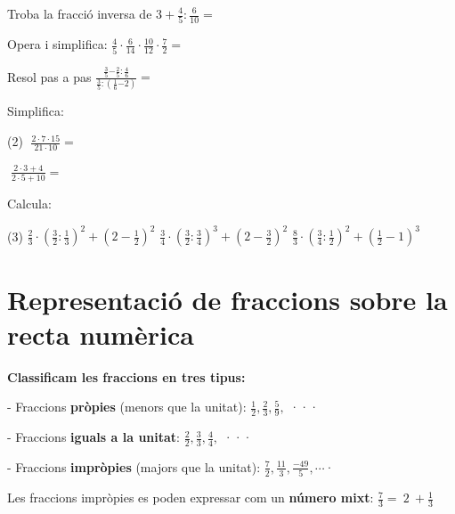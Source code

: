 \begin{mylist}
	\exer \spen Troba la fracció inversa de $\mathrm{3+}\frac{\mathrm{4}}{\mathrm{5}}\mathrm{:}\frac{\mathrm{6}}{\mathrm{10}}=$
	
	\exer  \spen Opera i simplifica: $\frac{4}{5} \cdot \frac{6}{14} \cdot \frac{10}{12} \cdot \frac{7}{2}=$
	
	\exer  Resol pas a pas  $\frac{\frac{\mathrm{3}}{\mathrm{5}}\mathrm{-}\frac{\mathrm{2}}{\mathrm{5}}\mathrm{:}\frac{\mathrm{4}}{\mathrm{6}}}{\frac{\mathrm{3}}{\mathrm{5}}\mathrm{:}\left( \frac{\mathrm{1}}{\mathrm{6}}\mathrm{-}\mathrm{2}\right)}=$ 
	
	\exer \spen Simplifica:  
	\begin{tasks}(2)
	\task $\; \frac{2\cdot 7\cdot 15}{21\cdot 10} = \quad \quad \quad$
	
	
	\task $\; \frac{2\cdot 3+4}{2\cdot 5+10}= $
	\end{tasks}
	\answers[cols=2]{[$1$, $\frac{1}{2}$]}

	\exer[1]  Calcula: 
 \begin{tasks}(3)
 	\task $\frac{2}{3} \cdot \left(\frac{3}{2} :\frac{1}{3} \right)^{2} +\left(2-\frac{1}{2} \right)^{2} $ 
 	\task $\frac{3}{4} \cdot \left(\frac{3}{2} :\frac{3}{4} \right)^{3} +\left(2-\frac{3}{2} \right)^{2} $ 
 	\task $\frac{8}{3} \cdot \left(\frac{3}{4} :\frac{1}{2} \right)^{2} +\left(\frac{1}{2} -1\right)^{3} $ 
 \end{tasks}


\end{mylist}

\newpage
\section{Representació de fraccions sobre la recta numèrica}
 
\begin{theorybox}

\textbf{Classificam les fraccions en tres tipus:}

- Fraccions \textbf{pròpies} (menors que la unitat): $\frac{1}{2},\frac{2}{3},\frac{5}{9},$ ···

- Fraccions \textbf{iguals a la unitat}: $\frac{2}{2},\frac{3}{3},\frac{4}{4},$ ···

- Fraccions \textbf{impròpies} (majors que la unitat): $\frac{7}{2}, \frac{11}{3}, \frac{-49}{5}, \cdots$·

Les fraccions impròpies es poden expressar com un\textbf{ número mixt}:  
$\frac{7}{3}=\ 2\ +\frac{1}{3}$

\end{theorybox}


